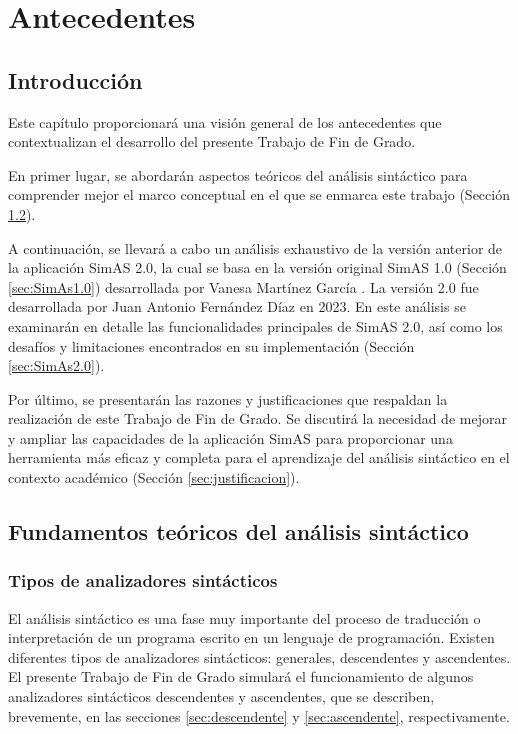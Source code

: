 \chapter{Antecedentes}\label{cap:antecedentes}

\section{Introducción}

Este capítulo proporcionará una visión general de los antecedentes que contextualizan el desarrollo del presente Trabajo de Fin de Grado. 

En primer lugar, se abordarán aspectos teóricos del análisis sintáctico para comprender mejor el marco conceptual en el que se enmarca este trabajo (Sección \ref{sec:fundamentos}). 


A continuación, se llevará a cabo un análisis exhaustivo de la versión anterior de la aplicación SimAS 2.0, la cual se basa en la versión original SimAS 1.0 (Sección \ref{sec:SimAs1.0}) desarrollada por Vanesa Martínez García \cite{vanesa}. La versión 2.0 fue desarrollada por Juan Antonio Fernández Díaz \cite{juan} en 2023. En este análisis se examinarán en detalle las funcionalidades principales de SimAS 2.0, así como los desafíos y limitaciones encontrados en su implementación (Sección \ref{sec:SimAs2.0}).

Por último, se presentarán las razones y justificaciones que respaldan la realización de este Trabajo de Fin de Grado. Se discutirá la necesidad de mejorar y ampliar las capacidades de la aplicación SimAS para proporcionar una herramienta más eficaz y completa para el aprendizaje del análisis sintáctico en el contexto académico (Sección \ref{sec:justificacion}).


\section{Fundamentos teóricos del análisis sintáctico}\label{sec:fundamentos}

\subsection{Tipos de analizadores sintácticos}

 El análisis sintáctico es una fase muy importante del proceso de traducción o interpretación de un programa escrito en un lenguaje de programación. Existen diferentes tipos de analizadores sintácticos: generales, descendentes y ascendentes. El presente Trabajo de Fin de Grado simulará el funcionamiento de algunos analizadores sintácticos descendentes y ascendentes, que se describen, brevemente, en las secciones \ref{sec:descendente} y \ref{sec:ascendente}, respectivamente.


